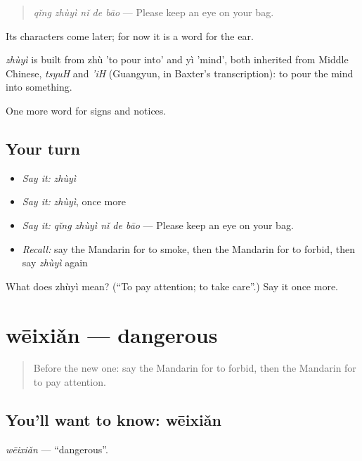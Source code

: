 \begin{quote}
\emph{qǐng zhùyì nǐ de bāo} — Please keep an eye on your bag.
\end{quote}

Its characters come later; for now it is a word for the ear.

\begin{cousinweb}
\emph{zhùyì} is built from zhù 'to pour into' and yì 'mind', both inherited from Middle Chinese, \emph{tsyuH} and \emph{'iH} (Guangyun, in Baxter's transcription): to pour the mind into something.
\end{cousinweb}

\begin{grammarlens}[title={What you've built}]
One more word for signs and notices.
\end{grammarlens}

\subsection*{Your turn}
\begin{itemize}
\raggedright
  \item \emph{Say it:} \emph{zhùyì}
  \item \emph{Say it:} \emph{zhùyì}, once more
  \item \emph{Say it:} \emph{qǐng zhùyì nǐ de bāo} — Please keep an eye on your bag.
  \item \emph{Recall:} say the Mandarin for to smoke, then the Mandarin for to forbid, then say \emph{zhùyì} again
\end{itemize}

\begin{tcolorbox}[breakable,colback=teal!4,colframe=teal!35!black,title={Before you move on}]
What does zhùyì mean? (\textquotedblleft{}To pay attention; to take care\textquotedblright{}.) Say it once more.
\end{tcolorbox}
\section[wēixiǎn]{wēixiǎn — dangerous}

\label{lesson:ZH-C115-weixian}



\begin{quote}
Before the new one: say the Mandarin for to forbid, then the Mandarin for to pay attention.
\end{quote}

\subsection*{You'll want to know: wēixiǎn}
\emph{wēixiǎn} — \textquotedblleft{}dangerous\textquotedblright{}.

